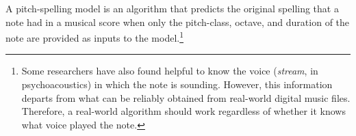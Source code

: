 

A pitch-spelling model is an algorithm that predicts the
original spelling that a note had in a musical score when
only the pitch-class, octave, and duration of the note are
provided as inputs to the model.\footnote{Some researchers
have also found helpful to know the voice (\emph{stream}, in
psychoacoustics) in which the note is sounding. However,
this information departs from what can be reliably obtained
from real-world digital music files. Therefore, a real-world
algorithm should work regardless of whether it knows what
voice played the note.}




